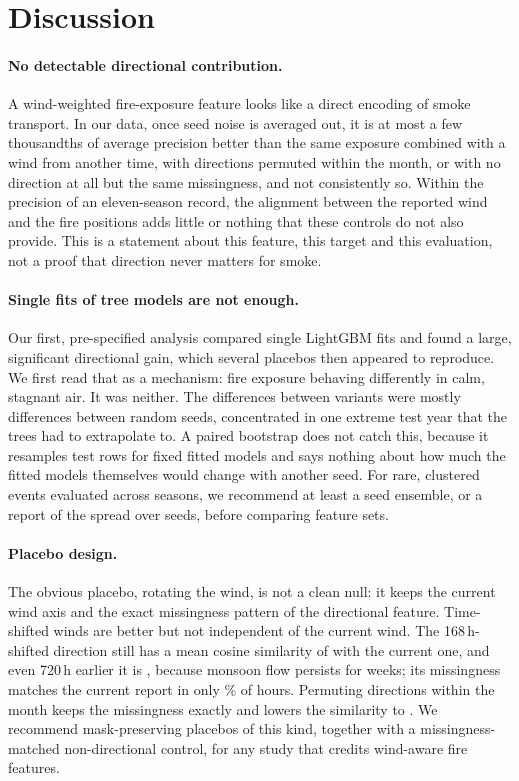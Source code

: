 \section{Discussion}
\label{sec:discussion}

\paragraph{No detectable directional contribution.}
A wind-weighted fire-exposure feature looks like a direct encoding of smoke transport. In our
data, once seed noise is averaged out, it is at most a few thousandths of average precision better
than the same exposure combined with a wind from another time, with directions permuted within
the month, or with no direction at all but the same missingness, and not consistently so. Within
the precision of an eleven-season record, the alignment between the reported wind and the fire
positions adds little or nothing that these controls do not also provide.
This is a statement about this feature, this target and this evaluation, not a proof that
direction never matters for smoke.

\paragraph{Single fits of tree models are not enough.}
Our first, pre-specified analysis compared single LightGBM fits and found a large, significant
directional gain, which several placebos then appeared to reproduce. We first read that as a
mechanism: fire exposure behaving differently in calm, stagnant air. It was neither. The
differences between variants were mostly differences between random seeds, concentrated in one
extreme test year that the trees had to extrapolate to. A paired bootstrap does not catch this,
because it resamples test rows for fixed fitted models and says nothing about how much the fitted
models themselves would change with another seed. For rare, clustered events evaluated across
seasons, we recommend at least a seed ensemble, or a report of the spread over seeds, before
comparing feature sets.

\paragraph{Placebo design.}
The obvious placebo, rotating the wind, is not a clean null: it keeps the current wind axis and
the exact missingness pattern of the directional feature. Time-shifted winds are better but not
independent of the current wind. The 168\,h-shifted direction still has a mean cosine similarity
of  with the current one, and even 720\,h earlier it is
, because monsoon flow persists for weeks; its missingness matches the
current report in only \% of hours. Permuting directions within the month
keeps the missingness exactly and lowers the similarity to . We recommend
mask-preserving placebos of this kind, together with a missingness-matched non-directional
control, for any study that credits wind-aware fire features.

